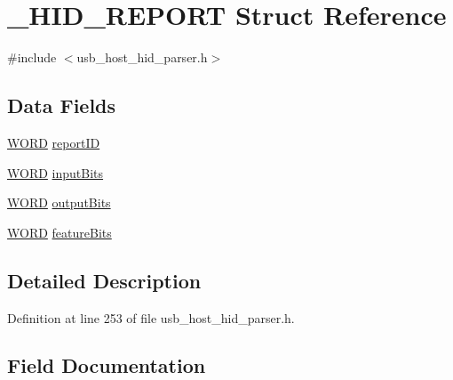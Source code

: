 \hypertarget{struct___h_i_d___r_e_p_o_r_t}{}\section{\+\_\+\+H\+I\+D\+\_\+\+R\+E\+P\+O\+R\+T Struct Reference}
\label{struct___h_i_d___r_e_p_o_r_t}


{\ttfamily \#include $<$usb\+\_\+host\+\_\+hid\+\_\+parser.\+h$>$}

\subsection*{Data Fields}
\begin{DoxyCompactItemize}
\item 
\hyperlink{_generic_type_defs_8h_a2b0e863dadf920709ec53d9088ee7c91}{W\+O\+R\+D} \hyperlink{struct___h_i_d___r_e_p_o_r_t_aebdb6c1d16fff393bae351f5b2c4dabc}{report\+I\+D}
\item 
\hyperlink{_generic_type_defs_8h_a2b0e863dadf920709ec53d9088ee7c91}{W\+O\+R\+D} \hyperlink{struct___h_i_d___r_e_p_o_r_t_a9bc78c44a5e28c5a59a7087dc11c5bb8}{input\+Bits}
\item 
\hyperlink{_generic_type_defs_8h_a2b0e863dadf920709ec53d9088ee7c91}{W\+O\+R\+D} \hyperlink{struct___h_i_d___r_e_p_o_r_t_ab8b179101fa292f0fefb80dbabb74875}{output\+Bits}
\item 
\hyperlink{_generic_type_defs_8h_a2b0e863dadf920709ec53d9088ee7c91}{W\+O\+R\+D} \hyperlink{struct___h_i_d___r_e_p_o_r_t_afbfbc33b8fb0cd296f94fcccbfe7d296}{feature\+Bits}
\end{DoxyCompactItemize}


\subsection{Detailed Description}


Definition at line 253 of file usb\+\_\+host\+\_\+hid\+\_\+parser.\+h.



\subsection{Field Documentation}
\hypertarget{struct___h_i_d___r_e_p_o_r_t_afbfbc33b8fb0cd296f94fcccbfe7d296}{}
